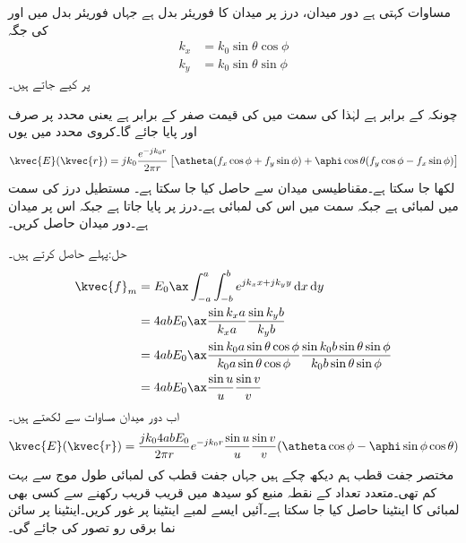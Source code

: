 مساوات  کہتی ہے دور میدان، درز پر میدان کا فوریئر بدل ہے جہاں فوریئر بدل میں  اور  کی جگہ  
\begin{align*}
k_x&=k_0\sin\theta\cos\phi \\
k_y&=k_0\sin\theta\sin\phi
\end{align*}
 پر کیے جاتے ہیں۔

چونکہ  کے برابر ہے لہٰذا  کی سمت میں  کی قیمت صفر کے برابر ہے یعنی  محدد پر صرف  اور  پایا جائے گا۔کروی محدد میں یوں
\begin{align}\label{مساوات_اینٹینا_دور_میدان_بذریعہ_فوریئر_بدل}
\kvec{E}(\kvec{r})=j k_0 \frac{e^{-j k_0 r}}{2\pi r}\left[\atheta (f_x \cos\phi+f_y \sin\phi)+\aphi \cos \theta (f_y\cos\phi-f_x\sin\phi) \right]
\end{align}
لکھا جا سکتا ہے۔مقناطیسی میدان  سے حاصل کیا جا سکتا ہے۔
مستطیل درز کی  سمت میں لمبائی  ہے جبکہ  سمت میں اس کی لمبائی  ہے۔درز  پر پایا جاتا  ہے جبکہ اس پر
 میدان  ہے۔دور میدان حاصل کریں۔

حل:پہلے  حاصل کرتے ہیں۔
\begin{align*}
\kvec{f}_m&=E_0 \ax \int_{-a}^{a}\int_{-b}^{b} e^{j k_x x +j k_y y} \dif x \dif y\\
&=4 a b E_0 \ax \frac{\sin k_x a}{k_x a}\frac{\sin k_y b}{k_y b}\\
&=4 a b E_0 \ax \frac{\sin k_0 a \sin \theta \cos \phi}{k_0 a\sin \theta \cos \phi}\frac{\sin k_0 b \sin \theta \sin\phi}{k_0 b\sin\theta\sin\phi}\\
&=4 a b E_0 \ax \frac{\sin u}{u} \frac{\sin v}{v}
\end{align*}
اب دور میدان مساوات  سے لکھتے ہیں۔
\begin{align*}
\kvec{E}(\kvec{r})=\frac{j k_0 4 a bE_0}{2\pi r}e^{-j k_0 r}\frac{\sin u}{u}\frac{\sin v}{v} (\atheta \cos\phi-\aphi \sin\phi\cos\theta)
\end{align*}
مختصر جفت قطب ہم دیکھ چکے ہیں جہاں جفت قطب کی لمبائی طول موج سے بہت کم  تھی۔متعدد تعداد کے نقطہ منبع کو سیدھ میں قریب قریب رکھنے سے کسی بھی لمبائی کا اینٹینا حاصل کیا جا سکتا ہے۔آئیں ایسے لمبے اینٹینا پر غور کریں۔اینٹینا پر سائن نما برقی رو تصور کی جائے گی۔

